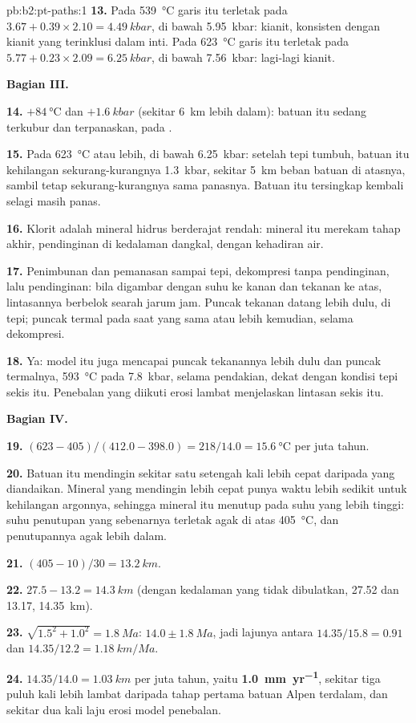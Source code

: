 \begin{solution}{pb:b2:pt-paths:1}
\textbf{13.} Pada \qty{539}{\celsius} garis itu terletak pada $3.67 + 0.39\times2.10 =
\qty{4.49}{kbar}$, di bawah \qty{5.95}{kbar}: kianit, konsisten dengan kianit yang terinklusi
dalam inti. Pada \qty{623}{\celsius} garis itu terletak pada $5.77 + 0.23\times2.09 = \qty{6.25}{kbar}$,
di bawah \qty{7.56}{kbar}: lagi-lagi kianit.

\noindent\textbf{Bagian III.}

\textbf{14.} $+\qty{84}{\celsius}$ dan $+\qty{1.6}{kbar}$ (sekitar \qty{6}{km} lebih dalam): batuan
itu sedang terkubur dan terpanaskan, pada .

\textbf{15.} Pada \qty{623}{\celsius} atau lebih, di bawah \qty{6.25}{kbar}: setelah tepi tumbuh,
batuan itu kehilangan sekurang-kurangnya \qty{1.3}{kbar}, sekitar \qty{5}{km} beban batuan di atasnya, sambil tetap
sekurang-kurangnya sama panasnya. Batuan itu tersingkap kembali selagi masih panas.

\textbf{16.} Klorit adalah mineral hidrus berderajat rendah: mineral itu merekam 
tahap akhir, pendinginan di kedalaman dangkal, dengan kehadiran air.

\textbf{17.} Penimbunan dan pemanasan sampai tepi, dekompresi tanpa pendinginan, lalu pendinginan:
bila digambar dengan suhu ke kanan dan tekanan ke atas, lintasannya berbelok searah jarum jam.
Puncak tekanan datang lebih dulu, di tepi; puncak termal pada saat yang sama atau lebih kemudian, selama
dekompresi.

\textbf{18.} Ya: model itu juga mencapai puncak tekanannya lebih dulu dan puncak termalnya,
\qty{593}{\celsius} pada \qty{7.8}{kbar}, selama pendakian, dekat dengan kondisi tepi
sekis itu. Penebalan yang diikuti erosi lambat menjelaskan lintasan sekis itu.

\noindent\textbf{Bagian IV.}

\textbf{19.} $(623 - 405)/(412.0 - 398.0) = 218/14.0 = \qty{15.6}{\celsius}$ per juta
tahun.

\textbf{20.} Batuan itu mendingin sekitar satu setengah kali lebih cepat daripada yang diandaikan. Mineral
yang mendingin lebih cepat punya waktu lebih sedikit untuk kehilangan argonnya, sehingga mineral itu menutup pada suhu yang lebih tinggi:
suhu penutupan yang sebenarnya terletak agak di atas \qty{405}{\celsius}, dan penutupannya
agak lebih dalam.

\textbf{21.} $(405 - 10)/30 = \qty{13.2}{km}$.

\textbf{22.} $27.5 - 13.2 = \qty{14.3}{km}$ (dengan kedalaman yang tidak dibulatkan, 27.52 dan 13.17,
\qty{14.35}{km}).

\textbf{23.} $\sqrt{1.5^2 + 1.0^2} = \qty{1.8}{Ma}$: $14.0 \pm \qty{1.8}{Ma}$, jadi lajunya
antara $14.35/15.8 = 0.91$ dan $14.35/12.2 = \qty{1.18}{km/Ma}$.

\textbf{24.} $14.35/14.0 = \qty{1.03}{km}$ per juta tahun, yaitu
\textbf{\qty[text-series-to-math=true]{1.0}{mm.yr^{-1}}}, sekitar tiga puluh kali lebih lambat daripada
tahap pertama  batuan Alpen terdalam, dan sekitar dua kali laju erosi
model penebalan.
\end{solution}
